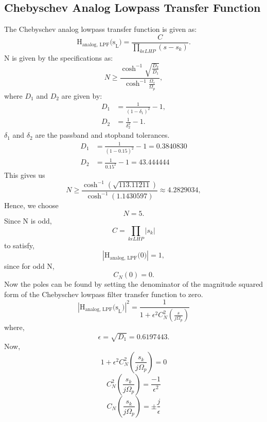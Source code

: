 \documentclass[12pt]{article}
\begin{document}
\subsection{Chebyschev Analog Lowpass Transfer Function}
The Chebyschev analog lowpass transfer function is given as:
\[\text{H}_{\text{analog, LPF}}\text{(s}_\text{L}\text{)} = \frac{C}{\prod_{k\epsilon LHP}(s - s_k)}.\]
N is given by the specifications as:
\[N \geq \frac{\cosh^{-1}\sqrt{\frac{D_2}{D_1}}}{\cosh^{-1}{\frac{\Omega_s}{\Omega_p}}},\]
where $D_1$ and $D_2$ are given by:
\begin{align*}
    D_1 &= \frac{1}{(1 - \delta_1)^2} - 1,\\
    D_2 &= \frac{1}{\delta_2^2} - 1.
\end{align*}
$\delta_1$ and $\delta_2$ are the passband and stopband tolerances.
\begin{align*}
    D_1 &= \frac{1}{(1 - 0.15)^2} - 1 = 0.3840830\\
    D_2 &= \frac{1}{0.15^2} - 1 = 43.444444
\end{align*}
This gives us
\[N \geq \frac{\cosh^{-1}(\sqrt{113.11211})}{\cosh^{-1}(1.1430597)} \approx 4.2829034,\]
Hence, we choose\[N = 5.\]
Since N is odd,
\[C = \prod_{k\epsilon LHP}|s_k|\]
to satisfy,
\[|\text{H}_{\text{analog, LPF}}\text{(0)}| = 1,\]
since for odd N,
\[C_N(0) = 0.\]
Now the poles can be found by setting the denominator of the magnitude squared form of the Chebyschev lowpass filter transfer function to zero.
\[|\text{H}_{\text{analog, LPF}}\text{(s}_\text{L}\text{)}|^2 = \frac{1}{1 + \epsilon^2C_N^2(\frac{s}{j\Omega_p})}\]
where,
\[\epsilon = \sqrt{D_1} = 0.6197443.\]
Now,
\[1 + \epsilon^2C_N^2\left(\frac{s_k}{j\Omega_p}\right) = 0\]
\[C_N^2\left(\frac{s_k}{j\Omega_p}\right) = \frac{-1}{\epsilon^2}\]
\[C_N\left(\frac{s_k}{j\Omega_p}\right) = \pm\frac{j}{\epsilon}\]
\end{document}
